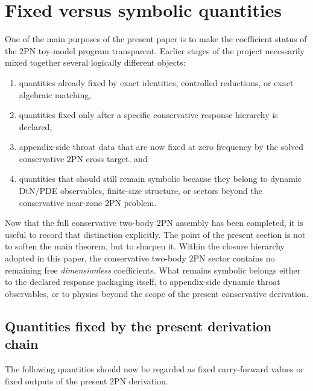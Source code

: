 \documentclass[11pt]{article}
\newcommand{\TwoPN}{\mathrm{2PN}}
\newcommand{\DtN}{\mathrm{DtN}}
\begin{document}
\section{Fixed versus symbolic quantities}
\label{sec:status-ledger}

One of the main purposes of the present paper is to make the coefficient status of the
\(
\TwoPN
\) toy-model program transparent.
Earlier stages of the project necessarily mixed together several logically different
objects:
\begin{enumerate}[leftmargin=1.5em]
  \item quantities already fixed by exact identities, controlled reductions, or exact
  algebraic matching,
  \item quantities fixed only after a specific conservative response hierarchy is
  declared,
  \item appendix-side throat data that are now fixed at zero frequency by the solved
  conservative \(\TwoPN\) cross target, and
  \item quantities that should still remain symbolic because they belong to dynamic
  \(\DtN\)/PDE observables, finite-size structure, or sectors beyond the conservative
  near-zone \(\TwoPN\) problem.
\end{enumerate}

Now that the full conservative two-body \(\TwoPN\) assembly has been completed, it is
useful to record that distinction explicitly.
The point of the present section is not to soften the main theorem, but to sharpen it.
Within the closure hierarchy adopted in this paper, the conservative two-body
\(\TwoPN\) sector contains no remaining free \emph{dimensionless} coefficients.
What remains symbolic belongs either to the declared response packaging itself, to
appendix-side dynamic throat observables, or to physics beyond the scope of the present
conservative derivation.

\subsection{Quantities fixed by the present derivation chain}
\label{sec:status-fixed}

The following quantities should now be regarded as fixed carry-forward values or fixed
outputs of the present \(\TwoPN\) derivation.
\end{document}
